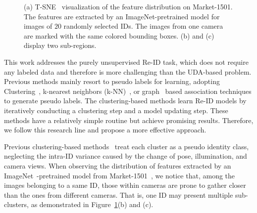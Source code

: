 \documentclass[letterpaper]{article} %
\begin{document}
\begin{figure}[t]
\begin{subfigure}{0.117\textwidth}
\caption{}
\end{subfigure}
\caption{(a) T-SNE~\cite{vanDerMaaten2008} visualization of the feature distribution on Market-1501. The features are extracted by an ImageNet-pretrained model for images of $20$ randomly selected IDs. The images from one camera are marked with the same colored bounding boxes. (b) and (c) display two sub-regions.}
\label{fig_intro}
\end{figure}


This work addresses the purely unsupervised Re-ID task, which does not require any labeled data and therefore is more challenging than the UDA-based problem. Previous methods mainly resort to pseudo labels for learning, adopting Clustering~\cite{lin2019aBottom,zeng2020hierarchical}, k-nearest neighbors (k-NN)~\cite{li2018unsupervised,chen2018deepa}, or graph~\cite{ye2017dynamic,wu2019graph} based association techniques to generate pseudo labels. The clustering-based methods learn Re-ID models by iteratively conducting a clustering step and a model updating step. These methods have a relatively simple routine but achieve promising results. Therefore, we follow this research line and propose a more effective approach.



Previous clustering-based methods~\cite{lin2019aBottom,zeng2020hierarchical,unsup_clustering,zhai2020ad} treat each cluster as a pseudo identity class, neglecting the intra-ID variance caused by the change of pose, illumination, and camera views. When observing the distribution of features extracted by an ImageNet~\cite{krizhevsky2012imagenet}-pretrained model from Market-1501~\cite{7410490}, we notice that, among the images belonging to a same ID, those within cameras are prone to gather closer than the ones from different cameras. That is, one ID may present multiple sub-clusters, as demonstrated in Figure~\ref{fig_intro}(b) and (c).
\end{document}
